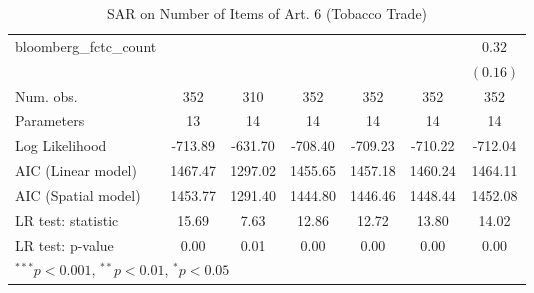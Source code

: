 \begin{table}[!h]
\begin{center}
\begin{tabular}{l c c c c c c }
bloomberg\_fctc\_count  &              &              &              &              &              & $0.32$       \\
                        &              &              &              &              &              & $(0.16)$     \\
\midrule
Num. obs.               & 352          & 310          & 352          & 352          & 352          & 352          \\
Parameters              & 13           & 14           & 14           & 14           & 14           & 14           \\
Log Likelihood          & -713.89      & -631.70      & -708.40      & -709.23      & -710.22      & -712.04      \\
AIC (Linear model)      & 1467.47      & 1297.02      & 1455.65      & 1457.18      & 1460.24      & 1464.11      \\
AIC (Spatial model)     & 1453.77      & 1291.40      & 1444.80      & 1446.46      & 1448.44      & 1452.08      \\
LR test: statistic      & 15.69        & 7.63         & 12.86        & 12.72        & 13.80        & 14.02        \\
LR test: p-value        & 0.00         & 0.01         & 0.00         & 0.00         & 0.00         & 0.00         \\
\bottomrule
\multicolumn{7}{l}{\scriptsize{$^{***}p<0.001$, $^{**}p<0.01$, $^*p<0.05$}}
\end{tabular}
\caption{SAR on Number of Items of Art. 6 (Tobacco Trade)}
\label{table:coefficients}
\end{center}
\end{table}
